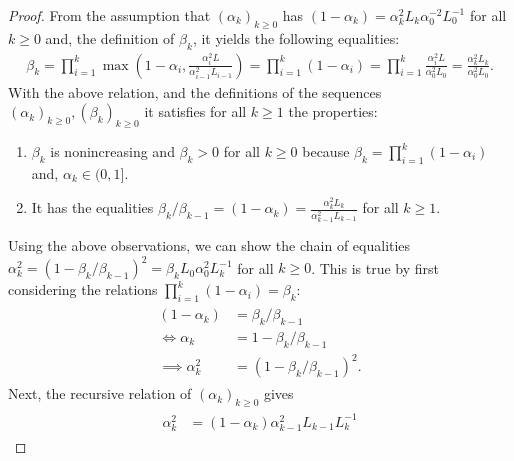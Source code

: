 \documentclass[12pt]{article}
\begin{document}
        \begin{proof}
            From the assumption that $(\alpha_k)_{k \ge 0}$ has $(1 - \alpha_k) = \alpha_k^2L_k \alpha_0^{-2}L_0^{-1}$ for all $k \ge 0$ and, the definition of $\beta_k$, it yields the following equalities: 
            \begin{align*}
                \beta_k = \prod_{i = 1}^k \max\left(
                    1 - \alpha_i, \frac{\alpha_i^2L}{\alpha_{i - 1}^2L_{i - 1}}
                \right) 
                = \prod_{i = 1}^k(1 - \alpha_i) 
                = \prod_{i = 1}^k \frac{\alpha_i^2L}{\alpha_0^2L_0} = \frac{\alpha_k^{2}L_k}{\alpha_0^2L_0}. 
            \end{align*}
            With the above relation, and the definitions of the sequences $(\alpha_k)_{k \ge 0}, (\beta_k)_{k\ge 0}$ it satisfies for all $k \ge 1$ the properties: 
            \begin{enumerate}[nosep]
                \item $\beta_k$ is nonincreasing and $\beta_k > 0$ for all $k \ge 0$ because $\beta_k = \prod_{i = 1}^{k} (1 - \alpha_i)$ and, $\alpha_k \in (0, 1]$. 
                \item It has the equalities $\beta_k/\beta_{k - 1} = (1 - \alpha_k) = \frac{\alpha_k^2L_k}{\alpha_{k - 1}^2 L_{k - 1}}$ for all $k \ge 1$. 
            \end{enumerate}
            Using the above observations, we can show the chain of equalities $\alpha_k^{2} = (1 - \beta_k/\beta_{k - 1})^2 = \beta_kL_0\alpha_0^2L_k^{-1}$ for all $k \ge 0$. 
            This is true by first considering the relations $\prod_{i = 1}^k(1 - \alpha_i) = \beta_k$: 
            \begin{align}\label{eqn:opt-cnvg-outr-loop-pitem1}\begin{split}
                (1 - \alpha_k) &= \beta_k/\beta_{k - 1}
                \\
                \iff 
                \alpha_k &= 1 - \beta_k / \beta_{k - 1}
                \\
                \implies 
                \alpha_k^2 &= (1 - \beta_k / \beta_{k - 1})^2.     
            \end{split}\end{align}
            Next, the recursive relation of $(\alpha_k)_{k \ge 0}$ gives
            \begin{align}\label{eqn:opt-cnvg-outr-loop-pitem2}\begin{split}
                \alpha_k^2&= (1 - \alpha_k)\alpha_{k - 1}^2L_{k - 1}L_k^{-1}

\end{split}
\end{align}
\end{proof}
\end{document}
